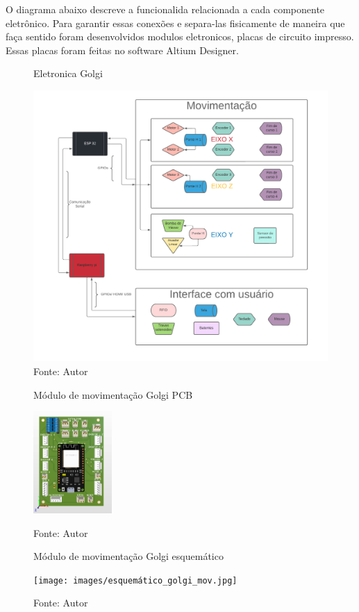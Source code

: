 \documentclass[../poliXuniversity_hospital_(USP)_report.tex]{subfiles}
\begin{document}
O diagrama abaixo descreve a funcionalida relacionada a cada componente eletrônico. Para garantir essas conexões e separa-las fisicamente de maneira que faça sentido foram desenvolvidos modulos eletronicos, placas de circuito impresso. Essas placas foram feitas no software Altium Designer. 
\begin{figure}[h!]
\centering
    \caption{Eletronica Golgi}
    \centering %
    \includegraphics[width=17cm]{images/Eletronica golgi bot (1).pdf}
    \caption*{Fonte: Autor}
    \label{figura:Eletronica Golgi}
\end{figure}


\begin{figure}[h]
\centering
    \begin{minipage}{0.5\textwidth}
        \centering
        \caption{Módulo de movimentação Golgi PCB}
        \centering %
        \includegraphics[width=3cm]{images/modulo_movimentação_golgi.png}
        \caption*{Fonte: Autor}
        \label{figura: Módulo de movimentação Golgi PCB}
        
    \end{minipage}\hfill
    \begin{minipage}{0.5\textwidth}
    
        \centering
        \caption{Módulo de movimentação Golgi esquemático}
        \centering %
        \texttt{[image: images/esquemático\_golgi\_mov.jpg]}
        \caption*{Fonte: Autor}
        \label{figura: Módulo de movimentação Golgi esquemático}
        
    \end{minipage}\hfill
\end{figure}
\end{document}
